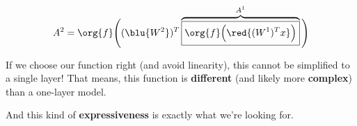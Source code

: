         \begin{equation}
            A^2 = 
            \org{f}
            \Bigg( 
                (\blu{W^2})^T 
                \overbrace{
                    \boxed{
                        \org{f}
                        \Big(
                            \red{ (W^1)^T x }
                        \Big)
                    }
                }^{A^1}
            \Bigg)
        \end{equation}

        If we choose our function right (and avoid linearity), this cannot be simplified to a single layer! That means, this function is \textbf{different} (and likely more \textbf{complex}) than a one-layer model. 
        
        And this kind of \textbf{expressiveness} is exactly what we're looking for.